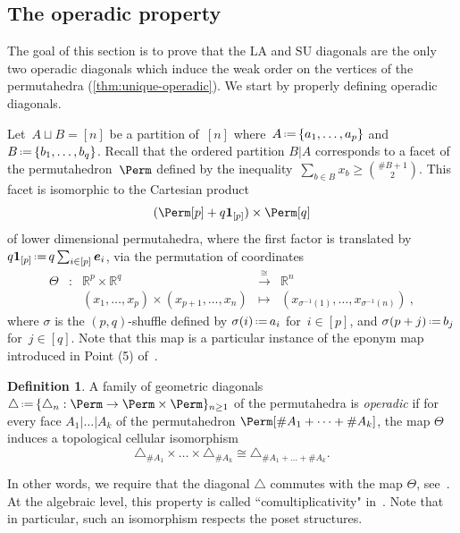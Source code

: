 \documentclass{amsart}
\newcommand{\darkblue}{\color{darkblue}} %
\theoremstyle{definition}
\newtheorem{definition}[theorem]{Definition}
\newcommand{\R}{\mathbb{R}} %
\renewcommand{\b}[1]{{\boldsymbol{#1}}} %
\newcommand{\one}{\b{1}} %
\newcommand{\eqdef}{\mbox{\,\raisebox{0.2ex}{\scriptsize\ensuremath{\mathrm:}}\ensuremath{=}\,}} %
\newcommand{\card}[1]{\##1} %
\newcommand{\defn}[1]{\textsl{\darkblue #1}} %
\renewcommand{\b}[1]{\boldsymbol{#1}} %
\newcommand{\SU}{\mathrm{SU}}
\newcommand{\LA}{\mathrm{LA}}
\begin{document}

\subsection{The operadic property}
\label{subsec:operadicProperty}

The goal of this section is to prove that the $\LA$ and $\SU$ diagonals are the only two operadic diagonals which induce the weak order on the vertices of the permutahedra (\cref{thm:unique-operadic}). 
We start by properly defining operadic diagonals.

Let~$A \sqcup B = [n]$ be a partition of~$[n]$ where~$A \eqdef \{a_1,\dots,a_p\}$ and~$B \eqdef \{b_1,\dots,b_q\}$.
Recall that the ordered partition $B | A$ corresponds to a facet of the permutahedron~$\Perm$ defined by the inequality~$\sum_{b \in B} x_b \ge \binom{\card{B}+1}{2}$.
This facet is isomorphic to the Cartesian product
\[
(\Perm[p] +q \one_{[p]}) \times \Perm[q]
\]
of lower dimensional permutahedra, where the first factor is translated by~$q \one_{[p]} \eqdef q \sum_{i \in [p]} \b{e}_i$, via the permutation of coordinates
\begin{equation*}
	\begin{matrix}
		\Theta & : & \R^{p} \times \R^{q} & \overset{\cong}{\longrightarrow} & \R^{n} \\
		 & & (x_1,\ldots,x_p) \times (x_{p+1}, \ldots, x_{n})  & \longmapsto & (x_{\sigma^{-1}(1)},\ldots,x_{\sigma^{-1}(n)}) \ , 
	\end{matrix}
\end{equation*}
where $\sigma$ is the $(p,q)$-shuffle defined by $\sigma(i) \eqdef a_i$ for~$i \in [p]$, and $\sigma(p+j)\eqdef b_j$ for~$j \in [q]$.
Note that this map is a particular instance of the eponym map introduced in Point (5) of~\cite[Prop.~2.3]{LaplanteAnfossi}.

\begin{definition}
\label{def:operadicDiagonal}
A family of geometric diagonals $\triangle \eqdef \{\triangle_n : \Perm \to \Perm \times \Perm\}_{n\geq 1}$ of the permutahedra is \defn{operadic} if for every face $A_1 | \ldots | A_k$ of the permutahedron $\Perm[\card{A_1}+\cdots + \card{A_k}]$, the map $\Theta$ induces a topological cellular isomorphism
\[
\triangle_{\card{A_1}} \times \ldots \times \triangle_{\card{A_k}} \cong \triangle_{\card{A_1} + \ldots + \card{A_k}} .
\]
\end{definition}

In other words, we require that the diagonal $\triangle$ commutes with the map $\Theta$, see~\cite[Sect.~4.2]{LaplanteAnfossi}.
At the algebraic level, this property is called ``comultiplicativity" in~\cite{SaneblidzeUmble}.
Note that in particular, such an isomorphism respects the poset structures. 
\end{document}
